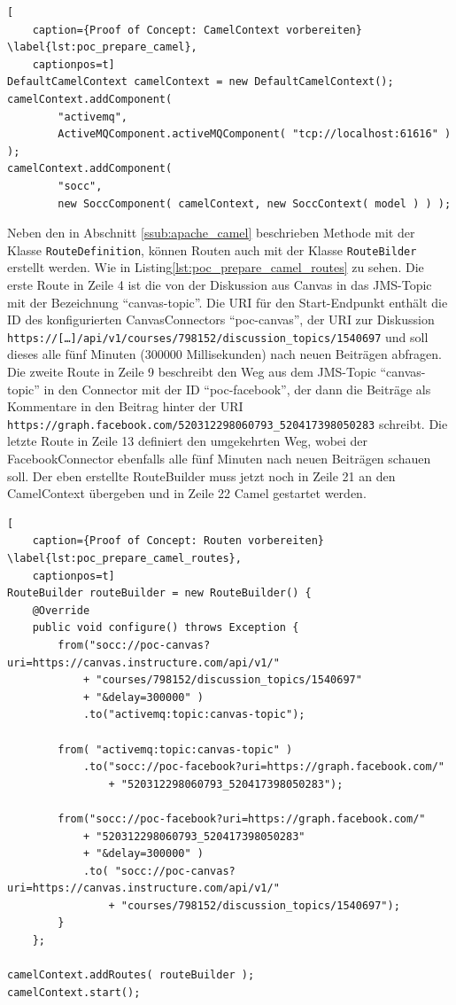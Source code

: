 \begin{lstlisting}[
    caption={Proof of Concept: CamelContext vorbereiten} \label{lst:poc_prepare_camel},
    captionpos=t]
DefaultCamelContext camelContext = new DefaultCamelContext();
camelContext.addComponent(
        "activemq",
        ActiveMQComponent.activeMQComponent( "tcp://localhost:61616" ) );
camelContext.addComponent(
        "socc",
        new SoccComponent( camelContext, new SoccContext( model ) ) );
\end{lstlisting}

Neben den in Abschnitt \ref{ssub:apache_camel} beschrieben Methode mit der Klasse \texttt{RouteDefinition}, können Routen auch mit der Klasse \texttt{RouteBilder} erstellt werden. Wie in Listing\ref{lst:poc_prepare_camel_routes} zu sehen. Die erste Route in Zeile 4 ist die von der Diskussion aus Canvas in das JMS-Topic mit der Bezeichnung \enquote{canvas-topic}. Die URI für den Start-Endpunkt enthält die ID des konfigurierten CanvasConnectors \enquote{poc-canvas}, der URI zur Diskussion \texttt{https://[\dots]/api/v1/courses/798152/discussion\_topics/1540697} und soll dieses alle fünf Minuten (300000 Millisekunden) nach neuen Beiträgen abfragen. Die zweite Route in Zeile 9 beschreibt den Weg aus dem JMS-Topic \enquote{canvas-topic} in den Connector mit der ID \enquote{poc-facebook}, der dann die Beiträge als Kommentare in den Beitrag hinter der URI \texttt{https://graph.facebook.com/520312298060793\_520417398050283} schreibt. Die letzte Route in Zeile 13 definiert den umgekehrten Weg, wobei der FacebookConnector ebenfalls alle fünf Minuten nach neuen Beiträgen schauen soll. Der eben erstellte RouteBuilder muss jetzt noch in Zeile 21 an den CamelContext übergeben und in Zeile 22 Camel gestartet werden.  

\begin{lstlisting}[
    caption={Proof of Concept: Routen vorbereiten} \label{lst:poc_prepare_camel_routes},
    captionpos=t]
RouteBuilder routeBuilder = new RouteBuilder() {
    @Override
    public void configure() throws Exception {
        from("socc://poc-canvas?uri=https://canvas.instructure.com/api/v1/"
            + "courses/798152/discussion_topics/1540697"
            + "&delay=300000" )
            .to("activemq:topic:canvas-topic");

        from( "activemq:topic:canvas-topic" )
            .to("socc://poc-facebook?uri=https://graph.facebook.com/"
                + "520312298060793_520417398050283");

        from("socc://poc-facebook?uri=https://graph.facebook.com/"
            + "520312298060793_520417398050283"
            + "&delay=300000" )
            .to( "socc://poc-canvas?uri=https://canvas.instructure.com/api/v1/"
                + "courses/798152/discussion_topics/1540697");
        }
    };

camelContext.addRoutes( routeBuilder );
camelContext.start();
\end{lstlisting}

